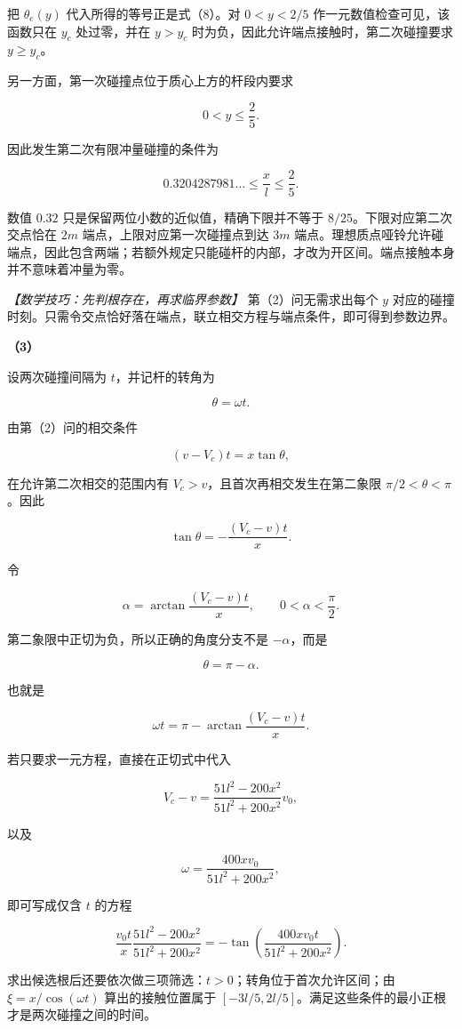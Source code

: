 \documentclass[12pt,a4paper,UTF8]{ctexart}
\begin{document}
把 \(\theta_e(y)\) 代入所得的等号正是式（8）。对 \(0<y<2/5\)
作一元数值检查可见，该函数只在 \(y_c\) 处过零，并在 \(y>y_c\)
时为负，因此允许端点接触时，第二次碰撞要求 \(y\ge y_c\)。

另一方面，第一次碰撞点位于质心上方的杆段内要求

\[0<y\le\frac25.\]

因此发生第二次有限冲量碰撞的条件为

\[\boxed{0.3204287981\ldots\le\frac{x}{l}\le\frac25}.\]

数值 \(0.32\) 只是保留两位小数的近似值，精确下限并不等于
\(8/25\)。下限对应第二次交点恰在 \(2m\) 端点，上限对应第一次碰撞点到达
\(3m\)
端点。理想质点哑铃允许碰端点，因此包含两端；若额外规定只能碰杆的内部，才改为开区间。端点接触本身并不意味着冲量为零。

\emph{【数学技巧：先判根存在，再求临界参数】} 第（2）问无需求出每个
\(y\)
对应的碰撞时刻。只需令交点恰好落在端点，联立相交方程与端点条件，即可得到参数边界。

\textbf{（3）}

设两次碰撞间隔为 \(t\)，并记杆的转角为

\[\theta=\omega t.\]

由第（2）问的相交条件

\[(v-V_c)t=x\tan\theta,\]

在允许第二次相交的范围内有 \(V_c>v\)，且首次再相交发生在第二象限
\(\pi/2<\theta<\pi\)。因此

\[\tan\theta=-\frac{(V_c-v)t}{x}.\]

令

\[\alpha=\arctan\frac{(V_c-v)t}{x},\qquad 0<\alpha<\frac\pi2.\]

第二象限中正切为负，所以正确的角度分支不是 \(-\alpha\)，而是

\[\theta=\pi-\alpha.\]

也就是

\[\boxed{\omega t=\pi-\arctan\frac{(V_c-v)t}{x}}. \tag{9}\]

若只要求一元方程，直接在正切式中代入

\[V_c-v=\frac{51l^2-200x^2}{51l^2+200x^2}v_0,\]

以及

\[\omega=\frac{400xv_0}{51l^2+200x^2},\]

即可写成仅含 \(t\) 的方程

\[\boxed{
\frac{v_0t}{x}\frac{51l^2-200x^2}{51l^2+200x^2}
=-\tan\left(\frac{400xv_0t}{51l^2+200x^2}\right)}.
\]

求出候选根后还要依次做三项筛选：\(t>0\)；转角位于首次允许区间；由
\(\xi=x/\cos(\omega t)\) 算出的接触位置属于
\([-3l/5,2l/5]\)。满足这些条件的最小正根才是两次碰撞之间的时间。
\end{document}
